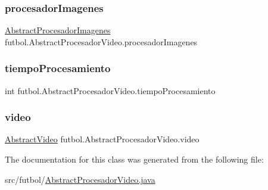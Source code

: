 \hypertarget{classfutbol_1_1_abstract_procesador_video_a63d5f4b8ca925a751a293ef83c46ee91}{}\label{classfutbol_1_1_abstract_procesador_video_a63d5f4b8ca925a751a293ef83c46ee91} 
\subsubsection{\texorpdfstring{procesador\+Imagenes}{procesadorImagenes}}
{\footnotesize\ttfamily \hyperlink{classfutbol_1_1_abstract_procesador_imagenes}{Abstract\+Procesador\+Imagenes} futbol.\+Abstract\+Procesador\+Video.\+procesador\+Imagenes\hspace{0.3cm}{\ttfamily [protected]}}

\hypertarget{classfutbol_1_1_abstract_procesador_video_a0e57f04a2b9cc0a2ec8c8401c450b04e}{}\label{classfutbol_1_1_abstract_procesador_video_a0e57f04a2b9cc0a2ec8c8401c450b04e} 
\subsubsection{\texorpdfstring{tiempo\+Procesamiento}{tiempoProcesamiento}}
{\footnotesize\ttfamily int futbol.\+Abstract\+Procesador\+Video.\+tiempo\+Procesamiento\hspace{0.3cm}{\ttfamily [protected]}}

\hypertarget{classfutbol_1_1_abstract_procesador_video_a5f7e50874b7d7f2ff79afde2c1e99b27}{}\label{classfutbol_1_1_abstract_procesador_video_a5f7e50874b7d7f2ff79afde2c1e99b27} 
\subsubsection{\texorpdfstring{video}{video}}
{\footnotesize\ttfamily \hyperlink{classfutbol_1_1_abstract_video}{Abstract\+Video} futbol.\+Abstract\+Procesador\+Video.\+video\hspace{0.3cm}{\ttfamily [protected]}}



The documentation for this class was generated from the following file\+:\begin{DoxyCompactItemize}
\item 
src/futbol/\hyperlink{_abstract_procesador_video_8java}{Abstract\+Procesador\+Video.\+java}\end{DoxyCompactItemize}
